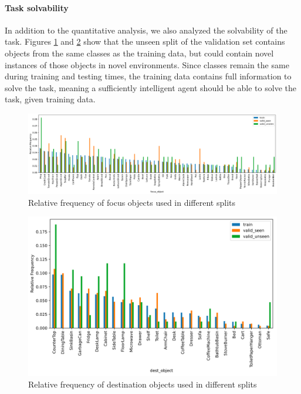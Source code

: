 \documentclass[11pt,a4paper]{article}
\begin{document}
\paragraph{Task solvability} In addition to the quantitative analysis, we also analyzed the solvability of the task. Figures \ref{fig:focus} and \ref{fig:dest} show that the unseen split of the validation set contains objects from the same classes as the training data, but could contain novel instances of those objects in novel environments. Since classes remain the same during training and testing times, the training data contains full information to solve the task, meaning a sufficiently intelligent agent should be able to solve the task, given training data.

\begin{figure}
    \centering
    \includegraphics[scale=0.3]{figures/focus_obj_freqs.png}
    \caption{Relative frequency of focus objects used in different splits}
    \label{fig:focus}
\end{figure}

\begin{figure}
    \centering
    \includegraphics[scale=0.5]{figures/dest_obj_freqs.png}
    \caption{Relative frequency of destination objects used in different splits}
    \label{fig:dest}
\end{figure}
\end{document}
